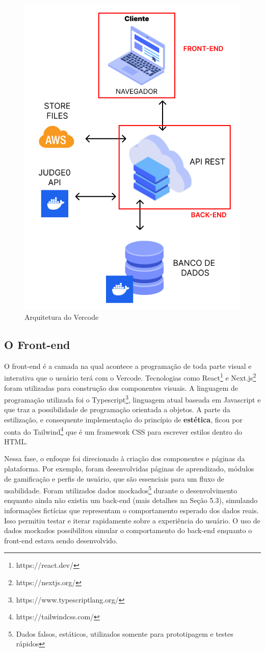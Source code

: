 \documentclass[12pt]{article}
\begin{document}
\begin{figure}[ht!]
\centering
\includegraphics[width=.6\textwidth]{imagens/arquitetura_vercode.png}
\caption{Arquitetura do Vercode}
\label{fig:arquitetura}
\end{figure}

\subsection{O Front-end} \label{sec:front_end}

O front-end é a camada na qual acontece a programação de toda parte visual e interativa que o usuário terá com o Vercode. Tecnologias como React\footnote{https://react.dev/} e Next.js\footnote{https://nextjs.org/} foram utilizadas para construção dos componentes visuais. A linguagem de programação utilizada foi o Typescript\footnote{https://www.typescriptlang.org/}, linguagem atual baseada em Javascript e que traz a possibilidade de programação orientada a objetos. A parte da estilização, e consequente implementação do princípio de \textbf{estética}, ficou por conta do Tailwind\footnote{https://tailwindcss.com/} que é um framework CSS para escrever estilos dentro do HTML.

Nessa fase, o enfoque foi direcionado à criação dos componentes e páginas da plataforma. Por exemplo, foram desenvolvidas páginas de aprendizado, módulos de gamificação e perfis de usuário, que são essenciais para um fluxo de usabilidade. Foram utilizados dados mockados\footnote{Dados falsos, estáticos, utilizados somente para prototipagem e testes rápidos} durante o desenvolvimento enquanto ainda não existia um back-end (mais detalhes na Seção 5.3), simulando informações fictícias que representam o comportamento esperado dos dados reais. Isso permitiu testar e iterar rapidamente sobre a experiência do usuário. O uso de dados mockados possibilitou simular o comportamento do back-end enquanto o front-end estava sendo desenvolvido.
\end{document}
